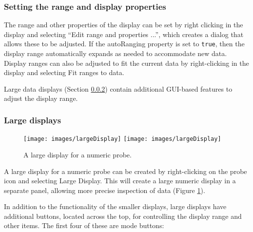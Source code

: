 \documentclass{article}
\begin{document}
\subsubsection{Setting the range and display properties}

The range and other properties of the display can be set by right
clicking in the display and selecting {\sf ``Edit range and properties
...''}, which creates a dialog that allows these to be adjusted. If the
{\sf autoRanging} property is set to {\tt true}, then the display range
automatically expands as needed to accommodate new data. Display ranges
can also be adjusted to fit the current data by right-clicking in the
display and selecting {\sf Fit ranges to data}.

Large data displays (Section \ref{LargeDisplay:sec}) contain
additional GUI-based features to adjust the display range.

\subsubsection{Large displays}
\label{LargeDisplay:sec}

\begin{figure}[h]
\begin{center}
\iflatexml
\texttt{[image: images/largeDisplay]}
\else
\texttt{[image: images/largeDisplay]}
\fi
\end{center}
\caption{A large display for a numeric probe.}%
\label{largeDisplayFig}
\end{figure}

A large display for a numeric probe can be created by right-clicking
on the probe icon and selecting {\sf Large Display}. This will create a
large numeric display in a separate panel, allowing more precise
inspection of data (Figure \ref{largeDisplayFig}).

In addition to the functionality of the smaller displays, large
displays have additional buttons, located across the top, for
controlling the display range and other items. The first four of these
are mode buttons:
\end{document}

